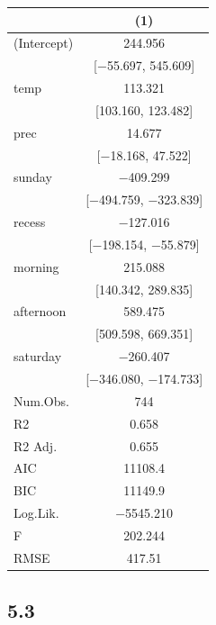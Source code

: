 \documentclass[
  letterpaper,
  DIV=11,
  numbers=noendperiod]{scrreprt}
\begin{document}
\begin{table}
\centering
\begin{tabular}[t]{lc}
\toprule
  & (1)\\
\midrule
(Intercept) & \num{244.956}\\
 & {}[\num{-55.697}, \num{545.609}]\\
temp & \num{113.321}\\
 & {}[\num{103.160}, \num{123.482}]\\
prec & \num{14.677}\\
 & {}[\num{-18.168}, \num{47.522}]\\
sunday & \num{-409.299}\\
 & {}[\num{-494.759}, \num{-323.839}]\\
recess & \num{-127.016}\\
 & {}[\num{-198.154}, \num{-55.879}]\\
morning & \num{215.088}\\
 & {}[\num{140.342}, \num{289.835}]\\
afternoon & \num{589.475}\\
 & {}[\num{509.598}, \num{669.351}]\\
saturday & \num{-260.407}\\
 & {}[\num{-346.080}, \num{-174.733}]\\
\midrule
Num.Obs. & \num{744}\\
R2 & \num{0.658}\\
R2 Adj. & \num{0.655}\\
AIC & \num{11108.4}\\
BIC & \num{11149.9}\\
Log.Lik. & \num{-5545.210}\\
F & \num{202.244}\\
RMSE & \num{417.51}\\
\bottomrule
\end{tabular}
\end{table}

\hypertarget{section-4}{%
\subsection{5.3}\label{section-4}}
\end{document}
